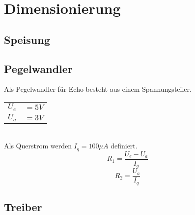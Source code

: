 



\section{Dimensionierung}

\subsection{Speisung}

\subsection{Pegelwandler}
Als Pegelwandler für Echo besteht aus einem Spannungsteiler. \\
\begin{tabular}{@{}ll}
  $U_e$ & $= 5 V$ \\
  $U_a$ & $= 3 V$ \\
\end{tabular} \\
Als Querstrom werden $I_q = 100 \mu A$ definiert. 
\[ R_1 = \frac{U_e - U_a}{I_q} \]
\[ R_2 = \frac{U_a}{I_q} \]

\subsection{Treiber}
